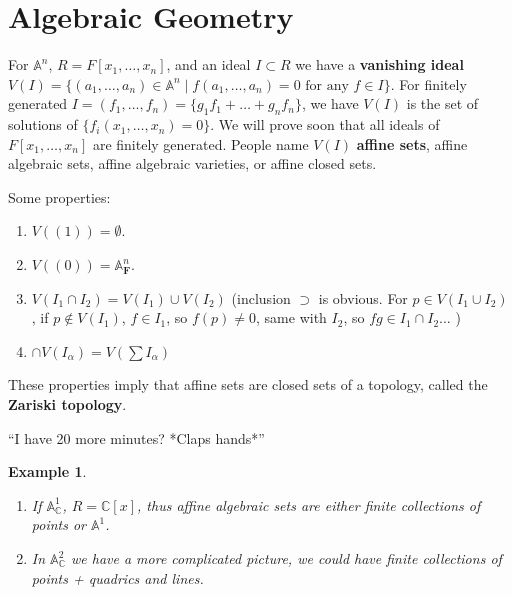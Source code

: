 \documentclass[12pt]{article}
\newcommand{\F}{\mathbf{F}}
\newcommand{\C}{\mathbb{C}}
\newcommand{\A}{\mathbb{A}}
\newtheorem{example}[]{Example}
\begin{document}
\section{Algebraic Geometry}
    For $\A^n$, $R = F[x_1, \dots, x_n]$, and an ideal $I \subset R$ we have a \textbf{vanishing ideal} $V(I) = \{(a_1, \dots, a_n) \in \A^n \mid f(a_1, \dots, a_n) = 0 \text{ for any } f \in I\}$. For finitely generated $I = (f_1,\dots, f_n) = \{g_1f_1 + \dots + g_nf_n\}$, we have $V(I)$ is the set of solutions of $\{f_i(x_1, \dots, x_n) = 0\}$. We will prove soon that all ideals of $F[x_1, \dots, x_n]$ are finitely generated. People name $V(I)$ \textbf{affine sets}, affine algebraic sets, affine algebraic varieties, or affine closed sets. \par 
    Some properties: 
    \begin{enumerate}
        \item $V((1)) = \emptyset$.
        \item $V((0)) = \A^n_\F$.
        \item $V(I_1 \cap I_2) = V(I_1) \cup V(I_2)$ (inclusion $\supset$ is obvious. For $p \in V(I_1 \cup I_2)$, if $p \not \in V(I_1)$, $f \in I_1$, so $f(p) \neq 0$, same with $I_2$, so $fg \in I_1 \cap I_2$... )
        \item $\cap V(I_\alpha) = V(\sum I_\alpha)$
    \end{enumerate}
    These properties imply that affine sets are closed sets of a topology, called the \textbf{Zariski topology}. \par 
    ``I have 20 more minutes? *Claps hands*''\par 
    \begin{example}
        \begin{enumerate}
            \item If $\A_\C^1$, $R = \C[x]$, thus affine algebraic sets are either finite collections of points or $\A^1$.
            \item In $\A^2_\C$ we have a more complicated picture, we could have finite collections of points + quadrics and lines. 
        \end{enumerate}
    \end{example}
\end{document}
